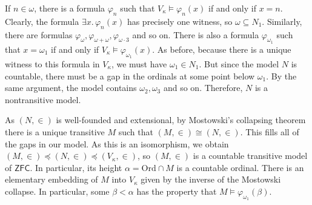 If \( n \in \omega \), there is a formula \( \varphi_n \) such that \( V_\kappa \vDash \varphi_n(x) \) if and only if \( x = n \).
Clearly, the formula \( \exists x.\, \varphi_n(x) \) has precisely one witness, so \( \omega \subseteq N_1 \).
Similarly, there are formulas \( \varphi_\omega, \varphi_{\omega + \omega}, \varphi_{\omega \cdot 3} \) and so on.
There is also a formula \( \varphi_{\omega_1} \) such that \( x = \omega_1 \) if and only if \( V_\kappa \vDash \varphi_{\omega_1}(x) \).
As before, because there is a unique witness to this formula in \( V_\kappa \), we must have \( \omega_1 \in N_1 \).
But since the model \( N \) is countable, there must be a gap in the ordinals at some point below \( \omega_1 \).
By the same argument, the model contains \( \omega_2, \omega_3 \) and so on.
Therefore, \( N \) is a nontransitive model.

As \( (N, \in) \) is well-founded and extensional, by Mostowski's collapsing theorem there is a unique transitive \( M \) such that \( (M, \in) \cong (N, \in) \).
This fills all of the gaps in our model.
As this is an isomorphism, we obtain \( (M, \in) \preceq (N, \in) \preceq (V_\kappa, \in) \), so \( (M, \in) \) is a countable transitive model of \( \mathsf{ZFC} \).
In particular, its height \( \alpha = \mathrm{Ord} \cap M \) is a countable ordinal.
There is an elementary embedding of \( M \) into \( V_\kappa \) given by the inverse of the Mostowski collapse.
In particular, some \( \beta < \alpha \) has the property that \( M \vDash \varphi_{\omega_1}(\beta) \).

